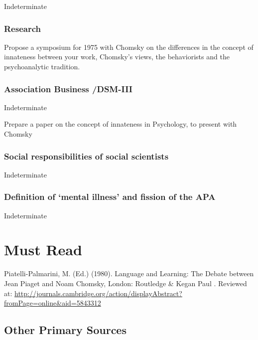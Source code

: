 \begin{refsection}
Indeterminate

\subsubsection{Research}
\label{research}

Propose a symposium for 1975 with Chomsky on the differences in the concept of innateness between your work, Chomsky’s views, the behaviorists and the psychoanalytic tradition.

\subsubsection{Association Business \slash  DSM-III}
\label{associationbusinessdsm-iii}

Indeterminate\begin{writingtask}[Piaget]\label{writingtask:piaget}
Prepare a paper on the concept of innateness in Psychology, to present with Chomsky
\end{writingtask}

\subsubsection{Social responsibilities of social scientists}
\label{socialresponsibilitiesofsocialscientists}

Indeterminate

\subsubsection{Definition of ‘mental illness’ and fission of the APA}
\label{definitionof‘mentalillness’andfissionoftheapa}

Indeterminate

\section{Must Read}
\label{mustread}

Piatelli-Palmarini, M. (Ed.) (1980). Language and Learning: The Debate between Jean Piaget and Noam Chomsky, London: Routledge \& Kegan Paul . Reviewed at: \url{http://journals.cambridge.org/action/displayAbstract?fromPage=online&aid=5843312}

\subsection{Other Primary Sources}
\label{otherprimarysources}


\end{refsection}
